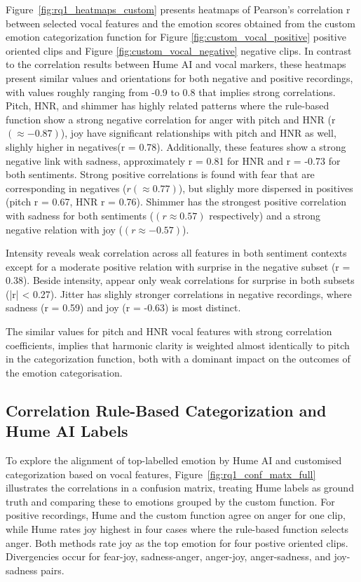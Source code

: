Figure~\ref{fig:rq1_heatmaps_custom} presents heatmaps of Pearson’s correlation r between selected vocal features and the emotion scores obtained from the custom emotion categorization 
function for Figure \ref{fig:custom_vocal_positive} positive oriented clips and Figure \ref{fig:custom_vocal_negative} negative clips. In contrast to the correlation results between Hume AI and vocal markers, these heatmaps present similar values and orientations for both negative and positive recordings, with values roughly ranging from -0.9 to 0.8 that implies strong correlations. 
Pitch, HNR, and shimmer has highly related patterns where the rule-based function show a strong negative correlation for anger with pitch and HNR (r$(\approx -0.87)$), joy have significant relationships with pitch and HNR as well, slighly higher in negatives(r = 0.78). Additionally, these features show a strong negative link with sadness, approximately r = 0.81 for HNR and r = -0.73 for both sentiments. Strong positive correlations is found with fear that are corresponding in negatives ($r (\approx 0.77)$), but slighly more dispersed in positives (pitch r = 0.67, HNR r = 0.76). 
Shimmer has the strongest positive correlation with sadness for both sentiments ($(r \approx 0.57)$ respectively) and a strong negative relation with joy ($(r \approx -0.57)$). 

Intensity reveals weak correlation across all features in both sentiment contexts except for a moderate positive relation with surprise in the negative subset (r = 0.38). Beside intensity, appear only weak correlations for surprise in both subsets (|r| < 0.27). 
Jitter has slighly stronger correlations in negative recordings, where sadness (r = 0.59) and joy (r = -0.63) is most distinct. 

The similar values for pitch and HNR vocal features with strong correlation coefficients, implies that harmonic clarity is weighted almost
identically to pitch in the categorization function, both with a dominant impact on the outcomes of the emotion categorisation. 

\subsection{Correlation Rule-Based Categorization and Hume AI Labels}

To explore the alignment of top-labelled emotion by Hume AI and customised categorization based on vocal features, Figure~\ref{fig:rq1_conf_matx_full} illustrates the correlations in a confusion matrix, treating Hume labels as ground truth and comparing these to emotions grouped by the custom function.  
For positive recordings, Hume and the custom function agree on anger for one clip, while Hume rates joy highest in four cases where the rule-based function selects anger. 
Both methods rate joy as the top emotion for four postive oriented clips. Divergencies occur for fear-joy, sadness-anger, anger-joy, anger-sadness, and joy-sadness pairs. 
 
